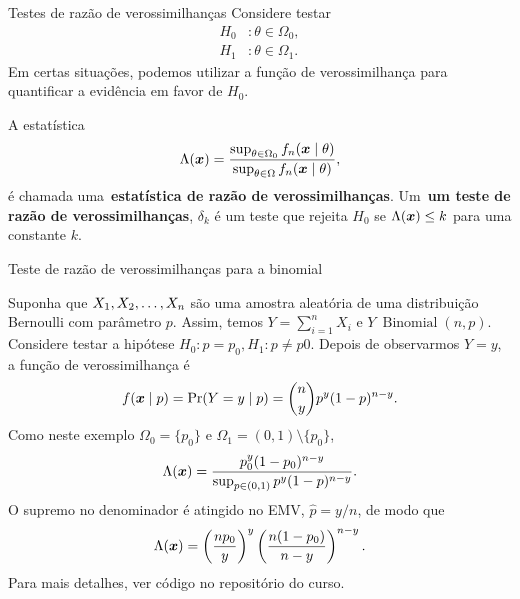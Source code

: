 \begin{frame}{Testes de razão de verossimilhanças}
 Considere testar 
  \begin{align*}
   H_0 &:  \theta \in \Omega_0, \\
   H_1&:  \theta \in \Omega_1. 
  \end{align*}
Em certas situações, podemos utilizar a função de verossimilhança para quantificar a evidência em favor de $H_0$.
\begin{defn}
 \label{def:LRT}
 A estatística
 \[ \Lambda(\boldsymbol{x}) = \frac{\sup_{\theta \in \Omega_0} f_n(\boldsymbol{x} \mid \theta) }{\sup_{\theta \in \Omega} f_n(\boldsymbol{x} \mid \theta)}, \]
 é chamada uma~\textbf{estatística de razão de verossimilhanças}.
 Um~\textbf{um teste de razão de verossimilhanças}, $\delta_k$ é um teste que rejeita $H_0$ se $\Lambda(\boldsymbol{x}) \leq k$ para uma constante $k$.
\end{defn}
\end{frame}

\begin{frame}{Teste de razão de verossimilhanças para a binomial}
\begin{exemplo}
\label{ex:LRT_simple_hypothesis}
 Suponha que $X_1, X_2, \ldots, X_n$ são uma amostra aleatória de uma distribuição Bernoulli com parâmetro $p$.
 Assim, temos $Y = \sum_{i=1}^n X_i$ e $Y~\operatorname{Binomial}(n, p)$.
 Considere testar a hipótese $H_0 :  p  = p_0, H_1:  p  \neq p0$.  
 Depois de observarmos $Y = y$, a função de verossimilhança é
 \[ f(\boldsymbol{x} \mid p) = \operatorname{Pr}(Y = y\mid p) = \binom{n}{y} p^y (1-p)^{n-y}. \]
 Como neste exemplo $\Omega_0 = \{p_0\}$ e $\Omega_1 = (0, 1)\setminus\{p_0\}$,
 \begin{equation*}
  \Lambda(\boldsymbol{x}) = \frac{p_0^y (1-p_0)^{n-y}}{\sup_{p \in (0,1)}  p^y (1-p)^{n-y}}.
 \end{equation*}
O supremo no denominador é atingido no EMV, $\hat{p} = y/n$, de modo que
 \begin{equation*}
  \Lambda(\boldsymbol{x}) = \left(\frac{np_0}{y}\right)^{y} \left(\frac{n(1-p_0)}{n-y}\right)^{n-y}.
 \end{equation*}
 Para mais detalhes, ver código no repositório do curso.
\end{exemplo} 
\end{frame}

